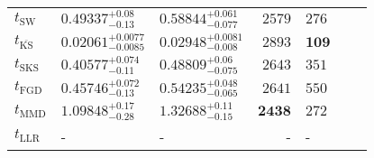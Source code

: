 \begin{tabular}{l|llr|llr}
	\midrule
	$t_{\mathrm{SW}}$ & $0.49337_{-0.13}^{+0.08}$ & $0.58844_{-0.077}^{+0.061}$ & $2579$ & $276$ \\
	$t_{\overline{\mathrm{KS}}}$ & ${\mathbf{0.02061_{-0.0085}^{+0.0077}}}$ & ${\mathbf{0.02948_{-0.008}^{+0.0081}}}$ & $2893$ & ${\mathbf{109}}$ \\
	$t_{\mathrm{SKS}}$ & $0.40577_{-0.11}^{+0.074}$ & $0.48809_{-0.075}^{+0.06}$ & $2643$ & $351$ \\
	$t_{\mathrm{FGD}}$ & $0.45746_{-0.13}^{+0.072}$ & $0.54235_{-0.065}^{+0.048}$ & $2641$ & $550$ \\
	$t_{\mathrm{MMD}}$ & $1.09848_{-0.28}^{+0.17}$ & $1.32688_{-0.15}^{+0.11}$ & ${\mathbf{2438}}$ & $272$ \\
	$t_{\mathrm{LLR}}$ & - & - & - & - \\
	\bottomrule
\end{tabular}